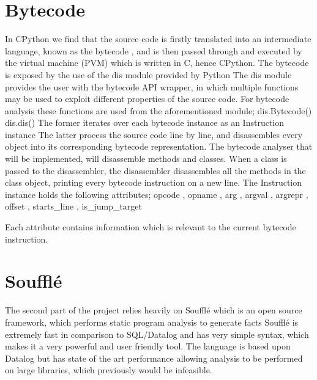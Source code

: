 \documentclass[12pt, a4paper]{report}
\theoremstyle{definition}
\theoremstyle{definition}%
\theoremstyle{definition}%
\theoremstyle{definition}%
\theoremstyle{definition}%
\theoremstyle{definition}%
\begin{document}
    \section{Bytecode} In CPython we find that the source code is firstly translated into an intermediate language, known as the {\selectfont 
    bytecode%
    },
    and is then passed through and executed by the virtual machine (PVM) %
    which is written in C, hence CPython.
    The {\selectfont 
    bytecode%
    } is exposed by the use of the {\selectfont 
    dis%
    }
    module provided by Python %
    The {\selectfont 
    dis%
    } module provides the user
    with the bytecode API wrapper, in which multiple functions may be used to exploit different properties of the source code.
    For bytecode analysis these functions are used from the aforementioned module; 
    {\selectfont 
    dis.Bytecode()%
    } %
    dis.dis()%
    The former iterates over each bytecode instance as an {\selectfont 
    Instruction%
    } instance %
    The latter process the source code line by line, and disassembles every object 
    into its corresponding bytecode representation. The bytecode analyser that will be implemented, will disassemble methods
    and classes. When a class is passed to the disassembler, the disassembler disassembles all the methods in the class object,
    printing every bytecode instruction on a new line.
    The {\selectfont 
    Instruction%
    } 
    instance holds the following attributes; 
    {\selectfont 
     opcode%
    },
    {\selectfont 
     opname%
    },
    {\selectfont 
     arg%
    },
    {\selectfont 
     argval%
    },
    {\selectfont 
     argrepr%
    },
    {\selectfont 
     offset%
    },
    {\selectfont 
     starts\_line%
    },
    {\selectfont 
     is\_jump\_target%
    } %

    \par Each attribute contains information which is relevant to the current bytecode instruction.
    
    \section{Soufflé} The second part of the project relies heavily on Soufflé which is an open source
    framework, which performs static program analysis to generate facts %
    Soufflé is extremely fast in comparison
    to SQL/Datalog and has very simple syntax, which makes it a very powerful and user friendly tool. The language is based
    upon Datalog but has state of the art performance %
    allowing analysis to be performed on large libraries,
    which previously would be infeasible. 
    
\end{document}
